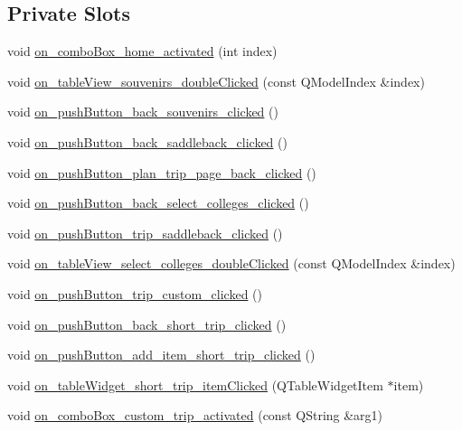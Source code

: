 \subsection*{Private Slots}
\begin{DoxyCompactItemize}
\item 
void \hyperlink{class_main_window_a1ce421fe3c9b953715c87aa435da36c6}{on\+\_\+combo\+Box\+\_\+home\+\_\+activated} (int index)
\item 
void \hyperlink{class_main_window_a234b2a619a1a3ff0be848b77bd7cc492}{on\+\_\+table\+View\+\_\+souvenirs\+\_\+double\+Clicked} (const Q\+Model\+Index \&index)
\item 
void \hyperlink{class_main_window_af757837a7b17e8bc5ad900af24f015d6}{on\+\_\+push\+Button\+\_\+back\+\_\+souvenirs\+\_\+clicked} ()
\item 
void \hyperlink{class_main_window_a5f3dda13966bd3e42983178c5726ea81}{on\+\_\+push\+Button\+\_\+back\+\_\+saddleback\+\_\+clicked} ()
\item 
void \hyperlink{class_main_window_a3801e237bced274087daba37f31d2e3f}{on\+\_\+push\+Button\+\_\+plan\+\_\+trip\+\_\+page\+\_\+back\+\_\+clicked} ()
\item 
void \hyperlink{class_main_window_af5afc5add64df89b5ac5d53ea00ed1f0}{on\+\_\+push\+Button\+\_\+back\+\_\+select\+\_\+colleges\+\_\+clicked} ()
\item 
void \hyperlink{class_main_window_ae59d459e50ffc1c6a6733c87517b3b0d}{on\+\_\+push\+Button\+\_\+trip\+\_\+saddleback\+\_\+clicked} ()
\item 
void \hyperlink{class_main_window_a30756d5a0a28d164846601568fe3a528}{on\+\_\+table\+View\+\_\+select\+\_\+colleges\+\_\+double\+Clicked} (const Q\+Model\+Index \&index)
\item 
void \hyperlink{class_main_window_a4d058fefde6201ee514b58f60ecac37e}{on\+\_\+push\+Button\+\_\+trip\+\_\+custom\+\_\+clicked} ()
\item 
void \hyperlink{class_main_window_a3f412ec418049aafe9d6a92c660066e2}{on\+\_\+push\+Button\+\_\+back\+\_\+short\+\_\+trip\+\_\+clicked} ()
\item 
void \hyperlink{class_main_window_a4fc2c04be8836db36dd7de56be77adc0}{on\+\_\+push\+Button\+\_\+add\+\_\+item\+\_\+short\+\_\+trip\+\_\+clicked} ()
\item 
void \hyperlink{class_main_window_ab229719a12a04789716b3fb9197d26a7}{on\+\_\+table\+Widget\+\_\+short\+\_\+trip\+\_\+item\+Clicked} (Q\+Table\+Widget\+Item $\ast$item)
\item 
void \hyperlink{class_main_window_ae57e300391b2d281d726e0e7b6ca334c}{on\+\_\+combo\+Box\+\_\+custom\+\_\+trip\+\_\+activated} (const Q\+String \&arg1)

\end{DoxyCompactItemize}
